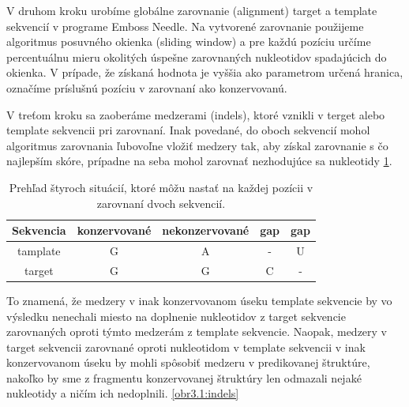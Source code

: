 \indent V druhom kroku urobíme globálne zarovnanie (alignment) target a template sekvencií v programe Emboss Needle. Na vytvorené zarovnanie použijeme algoritmus posuvného okienka (sliding window) a pre každú pozíciu určíme percentuálnu mieru okolitých úspešne zarovnaných nukleotidov spadajúcich do okienka. V prípade, že získaná hodnota je vyššia ako parametrom určená hranica, označíme príslušnú pozíciu v zarovnaní ako konzervovanú. 


\indent V treťom kroku sa zaoberáme medzerami (indels), ktoré vznikli v terget alebo template sekvencii pri zarovnaní. Inak povedané, do oboch sekvencií mohol algoritmus zarovnania ľubovoľne vložiť medzery tak, aby získal zarovnanie s čo najlepším skóre, prípadne na seba mohol zarovnať nezhodujúce sa nukleotidy \ref{tab3.1}. 

\begin{table}[b!]
\centering
\begin{tabular}{ccccc}
\toprule
Sekvencia  & konzervované  & nekonzervované & gap & gap \\
\midrule
tamplate  & G  & A & - & U \\
target  & G  & G & C & - \\
\bottomrule
\end{tabular}
\caption{Prehľad štyroch situácií, ktoré môžu nastať na každej pozícii v zarovnaní dvoch sekvencií.}\label{tab3.1}
\end{table}

To znamená, že medzery v inak konzervovanom úseku template sekvencie by vo výsledku nenechali miesto na doplnenie nukleotidov z target sekvencie zarovnaných oproti týmto medzerám z template sekvencie. 
Naopak, medzery v target sekvencii zarovnané oproti nukleotidom v template sekvencii v inak konzervovanom úseku by mohli spôsobiť medzeru v predikovanej štruktúre, nakoľko by sme z fragmentu konzervovanej štruktúry len odmazali nejaké nukleotidy a ničím ich nedoplnili. \ref{obr3.1:indels}

